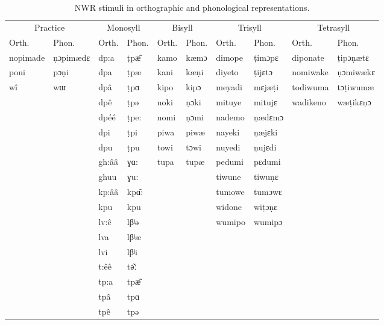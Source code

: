 \documentclass[english,,man,floatsintext]{apa6}
\begin{document}
\begin{table}

\caption{\label{tab:tab2-stims}NWR stimuli in orthographic and phonological representations.}
\centering
\begin{tabular}[t]{llllllllll}
\toprule
\multicolumn{2}{c}{Practice} & \multicolumn{2}{c}{Monosyll} & \multicolumn{2}{c}{Bisyll} & \multicolumn{2}{c}{Trisyll} & \multicolumn{2}{c}{Tetrasyll} \\
\cmidrule(l{3pt}r{3pt}){1-2} \cmidrule(l{3pt}r{3pt}){3-4} \cmidrule(l{3pt}r{3pt}){5-6} \cmidrule(l{3pt}r{3pt}){7-8} \cmidrule(l{3pt}r{3pt}){9-10}
Orth. & Phon. & Orth. & Phon. & Orth. & Phon. & Orth. & Phon. & Orth. & Phon.\\
\midrule
nopimade & ṇɔpimædɛ & dp:a & ṭpæ͂ & kamo & kæmɔ & dimope & ṭimɔpɛ & diponate & ṭipɔṇætɛ\\
poni & pɔṇi & dpa & ṭpæ & kani & kæṇi & diyeto & ṭijɛtɔ & nomiwake & ṇɔmiwækɛ\\
wî & wɯ & dpâ & ṭpɑ & kipo & kipɔ & meyadi & mɛjæṭi & todiwuma & tɔṭiwumæ\\
 &  & dpê & ṭpə & noki & ṇɔki & mituye & mitujɛ & wadikeno & wæṭikɛṇɔ\\
 &  & dpéé & ṭpe: & nomi & ṇɔmi & nademo & ṇædɛmɔ &  & \\
\addlinespace
 &  & dpi & ṭpi & piwa & piwæ & nayeki & ṇæjɛki &  & \\
 &  & dpu & ṭpu & towi & tɔwi & nuyedi & ṇujɛdi &  & \\
 &  & gh:ââ & ɣɑ: & tupa & tupæ & pedumi & pɛdumi &  & \\
 &  & ghuu & ɣu: &  &  & tiwune & tiwuṇɛ &  & \\
 &  & kp:ââ & kpɑ͂: &  &  & tumowe & tumɔwɛ &  & \\
\addlinespace
 &  & kpu & kpu &  &  & widone & wiṭɔṇɛ &  & \\
 &  & lv:ê & lβʲə &  &  & wumipo & wumipɔ &  & \\
 &  & lva & lβʲæ &  &  &  &  &  & \\
 &  & lvi & lβʲi &  &  &  &  &  & \\
 &  & t:êê & tə͂ː &  &  &  &  &  & \\
\addlinespace
 &  & tp:a & tpæ͂ &  &  &  &  &  & \\
 &  & tpâ & tpɑ &  &  &  &  &  & \\
 &  & tpê & tpə &  &  &  &  &  & \\
\bottomrule
\end{tabular}
\end{table}
\end{document}
